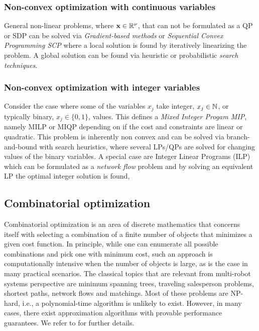 \subsubsection{Non-convex optimization with continuous variables}
General non-linear problems, where $\textbf{x}\in\mathbb{R}^\nu$, that can not be formulated as a QP or SDP can be solved via \emph{Gradient-based methods} or \emph{Sequential Convex Programming SCP} where a local solution is found by iteratively linearizing the problem. A global solution can be found via heuristic or probabilistic \emph{search techniques}.  

\subsubsection{Non-convex optimization with integer variables}
Consider the case where some of the variables $x_j$ take integer, $x_j \in \mathbb{N}$, or typically binary, $x_j \in \{0,1\}$, values.
This defines a \emph{Mixed Integer Progam MIP}, namely MILP or MIQP depending on if the cost and constraints are linear or quadratic. This problem is inherently non convex and can be solved via branch-and-bound with search heuristics, where several LPs/QPs are solved for changing values of the binary variables. A special case are Integer Linear Programs (ILP) which can be formulated as a \emph{network flow} problem and by solving an equivalent LP the optimal integer solution is found,

\subsection{Combinatorial optimization}
Combinatorial optimization is an area of discrete mathematics that concerns itself with 
selecting a combination of a finite number of objects that minimizes a given cost function. In principle, while one can enumerate all possible combinations and pick one with minimum cost, such an approach is computationally intensive when the number of objects is large, as is the case in many practical scenarios. The classical topics that are relevant from multi-robot systems perspective are minimum spanning trees, traveling salesperson problems, shortest paths, network flows and matchings. Most of these problems are NP-hard, i.e., a polynomial-time algorithm is unlikely to exist. However, in many cases, there exist approximation algorithms with provable performance guarantees. We refer to \cite{Korte.Vygen:02} for further details.

%

